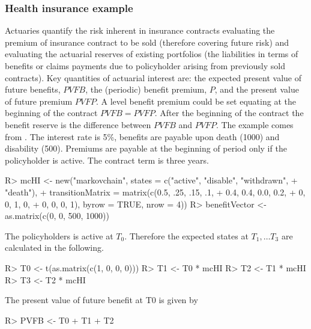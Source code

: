 \documentclass[nojss]{jss}
\begin{document}
\subsubsection{Health insurance example}\label{sec:hi}
Actuaries quantify the risk inherent in insurance contracts evaluating the premium of insurance contract to be sold (therefore covering future risk) and evaluating the actuarial reserves of existing portfolios (the liabilities in terms of benefits or claims payments due to policyholder arising from previously sold contracts).
Key quantities of actuarial interest are: the expected present value of future benefits, $PVFB$, the (periodic) benefit premium, $P$, and the present value of future premium $PVFP$. A level benefit premium could be set equating at the beginning of the contract $PVFB=PVFP$. After the beginning of the contract the benefit reserve is the difference between $PVFB$ and $PVFP$.
The example comes from \cite{deshmukh2012multiple}. The interest rate is 5\%, 
benefits are payable upon death (1000) and disability (500). Premiums are 
payable at the beginning of period only if the policyholder is active. The contract term is three years.

\begin{Schunk}
\begin{Sinput}
R> mcHI <- new("markovchain", states = c("active", "disable", "withdrawn", 
+                                        "death"),
+           transitionMatrix = matrix(c(0.5, .25, .15, .1,
+                                     0.4, 0.4, 0.0, 0.2,
+                                     0, 0, 1, 0,
+                                     0, 0, 0, 1), byrow = TRUE, nrow = 4))
R> benefitVector <- as.matrix(c(0, 0, 500, 1000))
\end{Sinput}
\end{Schunk}

The policyholders is active at $T_0$. Therefore the expected states at $T_1, \ldots T_3$ are calculated in the following.

\begin{Schunk}
\begin{Sinput}
R> T0 <- t(as.matrix(c(1, 0, 0, 0)))
R> T1 <- T0 * mcHI
R> T2 <- T1 * mcHI
R> T3 <- T2 * mcHI
\end{Sinput}
\end{Schunk}

The present value of future benefit at T0 is given by

\begin{Schunk}
\begin{Sinput}
R> PVFB <- T0 %*% benefitVector * 1.05 ^ -0 + 
+    T1 %*% benefitVector * 1.05 ^ -1+
+    T2 %*% benefitVector * 1.05 ^ -2 + T3 %*% benefitVector * 1.05 ^ -3
\end{Sinput}
\end{Schunk}
\end{document}
